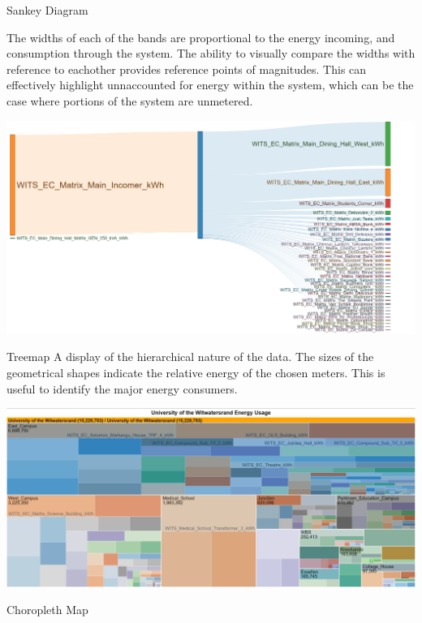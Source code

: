 \documentclass[8pt,xcolor={dvipsnames}]{beamer}
\begin{document}
{\begin{frame}{Sankey Diagram}

The widths of each of the bands are proportional to the energy incoming, and consumption through the system. The ability to visually compare the widths with reference to eachother provides reference points of magnitudes. 
This can effectively highlight unnaccounted for energy within the system, which can be the case where portions of the system are unmetered.
\begin{center}
	\includegraphics[width=\textwidth, trim=20 10 130 0, clip]{SankeyMatrix}
\end{center}
\end{frame}


\begin{frame}{Treemap}
A display of the hierarchical nature of the data. The sizes of the geometrical shapes indicate the relative energy of the chosen meters. This is useful to identify the major energy consumers.
\begin{center}
	\includegraphics[width=\textwidth, trim=0 0 0 10, clip]{Treemap}
\end{center}
\end{frame}


\begin{frame}{Choropleth Map}


\end{frame}}
\end{document}
